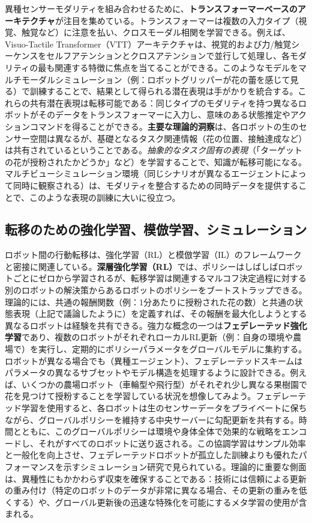 \documentclass[a4paper,fleqn,10pt,twocolumn]{template_v1.0}
\begin{document}
異種センサーモダリティを組み合わせるために、\textbf{トランスフォーマーベースのアーキテクチャ}が注目を集めている。トランスフォーマーは複数の入力タイプ（視覚、触覚など）に注意を払い、クロスモーダル相関を学習できる。例えば、Visuo-Tactile Transformer（VTT）アーキテクチャは、視覚的および力/触覚シーケンスをセルフアテンションとクロスアテンションで並行して処理し、各モダリティの最も関連する特徴に焦点を当てることができる\cite{Chen2022}。このようなモデルをマルチモーダルシミュレーション（例：ロボットグリッパーが花の蕾を感じて見る）で訓練することで、結果として得られる潜在表現は手がかりを統合する。これらの共有潜在表現は転移可能である：同じタイプのモダリティを持つ異なるロボットがそのデータをトランスフォーマーに入力し、意味のある状態推定やアクションコマンドを得ることができる。\textbf{主要な理論的洞察}は、各ロボットの生のセンサー空間は異なるが、基礎となるタスク関連情報（花の位置、接触達成など）は共有されているということである。\textit{抽象的なタスク固有の表現}（「ターゲットの花が授粉されたかどうか」など）を学習することで、知識が転移可能になる。マルチビューシミュレーション環境（同じシナリオが異なるエージェントによって同時に観察される）は、モダリティを整合するための同時データを提供することで、このような表現の訓練に大いに役立つ。

\subsection{転移のための強化学習、模倣学習、シミュレーション}
ロボット間の行動転移は、強化学習（RL）と模倣学習（IL）のフレームワークと密接に関連している。\textbf{深層強化学習（RL）}では、ポリシーはしばしばロボットごとにゼロから学習されるが、転移学習は関連するマルコフ決定過程に対する別のロボットの解決策からあるロボットのポリシーをブートストラップできる。理論的には、共通の報酬関数（例：1分あたりに授粉された花の数）と共通の状態表現（上記で議論したように）を定義すれば、その報酬を最大化しようとする異なるロボットは経験を共有できる。強力な概念の一つは\textbf{フェデレーテッド強化学習}であり、複数のロボットがそれぞれローカルRL更新（例：自身の環境や農場で）を実行し、定期的にポリシーパラメータをグローバルモデルに集約する。ロボットが異なる場合でも（異種エージェント）、フェデレーテッドスキームはパラメータの異なるサブセットやモデル構造を処理するように設計できる\cite{Jiang2023}\cite{Jiang2023a}。例えば、いくつかの農場ロボット（車輪型や飛行型）がそれぞれ少し異なる果樹園で花を見つけて授粉することを学習している状況を想像してみよう。フェデレーテッド学習を使用すると、各ロボットは生のセンサーデータをプライベートに保ちながら、グローバルポリシーを維持する中央サーバーに勾配更新を共有する。時間とともに、このグローバルポリシーは環境や身体全体で効果的な戦略をエンコードし、それがすべてのロボットに送り返される\cite{Jiang2023}\cite{Jiang2023a}。この協調学習はサンプル効率と一般化を向上させ、フェデレーテッドロボットが孤立した訓練よりも優れたパフォーマンスを示すシミュレーション研究で見られている。理論的に重要な側面は、異種性にもかかわらず収束を確保することである：技術には信頼による更新の重み付け（特定のロボットのデータが非常に異なる場合、その更新の重みを低くする）や、グローバル更新後の迅速な特殊化を可能にするメタ学習の使用が含まれる。
\end{document}
